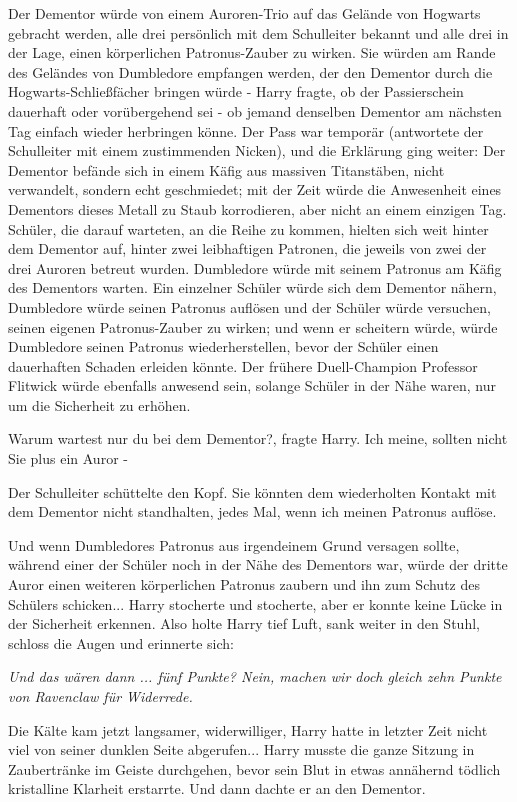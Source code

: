 Der Dementor würde von einem Auroren-Trio auf das Gelände von Hogwarts gebracht
werden, alle drei persönlich mit dem Schulleiter bekannt und alle drei in der
Lage, einen körperlichen Patronus-Zauber zu wirken. Sie würden am Rande des
Geländes von Dumbledore empfangen werden, der den Dementor durch die
Hogwarts-Schließfächer bringen würde - Harry fragte, ob der Passierschein
dauerhaft oder vorübergehend sei - ob jemand denselben Dementor am nächsten Tag
einfach wieder herbringen könne. Der Pass war temporär (antwortete der
Schulleiter mit einem zustimmenden Nicken), und die Erklärung ging weiter: Der
Dementor befände sich in einem Käfig aus massiven Titanstäben, nicht verwandelt,
sondern echt geschmiedet; mit der Zeit würde die Anwesenheit eines Dementors
dieses Metall zu Staub korrodieren, aber nicht an einem einzigen Tag. Schüler,
die darauf warteten, an die Reihe zu kommen, hielten sich weit hinter dem
Dementor auf, hinter zwei leibhaftigen Patronen, die jeweils von zwei der drei
Auroren betreut wurden. Dumbledore würde mit seinem Patronus am Käfig des
Dementors warten. Ein einzelner Schüler würde sich dem Dementor nähern,
Dumbledore würde seinen Patronus auflösen und der Schüler würde versuchen,
seinen eigenen Patronus-Zauber zu wirken; und wenn er scheitern würde, würde
Dumbledore seinen Patronus wiederherstellen, bevor der Schüler einen dauerhaften
Schaden erleiden könnte. Der frühere Duell-Champion Professor Flitwick würde
ebenfalls anwesend sein, solange Schüler in der Nähe waren, nur um die
Sicherheit zu erhöhen.

\glqq{}Warum wartest nur du bei dem Dementor?\grqq{}, fragte Harry. \glqq{}Ich
meine, sollten nicht Sie plus ein Auror -\grqq{}

Der Schulleiter schüttelte den Kopf. \glqq{}Sie könnten dem wiederholten Kontakt
mit dem Dementor nicht standhalten, jedes Mal, wenn ich meinen Patronus
auflöse.\grqq{}

Und wenn Dumbledores Patronus aus irgendeinem Grund versagen sollte, während
einer der Schüler noch in der Nähe des Dementors war, würde der dritte Auror
einen weiteren körperlichen Patronus zaubern und ihn zum Schutz des Schülers
schicken... Harry stocherte und stocherte, aber er konnte keine Lücke in der
Sicherheit erkennen. Also holte Harry tief Luft, sank weiter in den Stuhl,
schloss die Augen und erinnerte sich:

\emph{\glqq{}Und das wären dann ... fünf Punkte? Nein, machen wir doch gleich
zehn Punkte von Ravenclaw für Widerrede.}\grqq{}

Die Kälte kam jetzt langsamer, widerwilliger, Harry hatte in letzter Zeit nicht
viel von seiner dunklen Seite abgerufen... Harry musste die ganze Sitzung in
Zaubertränke im Geiste durchgehen, bevor sein Blut in etwas annähernd tödlich
kristalline Klarheit erstarrte. Und dann dachte er an den Dementor.

